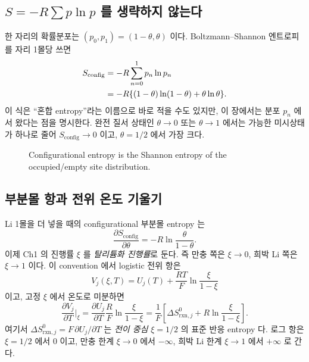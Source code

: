 \documentclass[11pt,a4paper]{article}
\newcommand{\rxn}{\mathrm{rxn}}
\newcommand{\conf}{\mathrm{config}}
\begin{document}
\subsection{\texorpdfstring{$S=-R\sum p\ln p$}{S=-R sum p ln p} 를 생략하지 않는다}
한 자리의 확률분포는 $(p_0,p_1)=(1-\theta,\theta)$ 이다. Boltzmann--Shannon
엔트로피를 자리 1몰당 쓰면
\begin{align}
S_\conf
&=-R\sum_{n=0}^{1}p_n\ln p_n \notag\\
&=-R\{(1-\theta)\ln(1-\theta)+\theta\ln\theta\}.
\label{eq:sconfig}
\end{align}
이 식은 ``혼합 entropy''라는 이름으로 바로 적을 수도 있지만, 이 장에서는 분포
$p_n$ 에서 왔다는 점을 명시한다. 완전 질서 상태인 $\theta\to0$ 또는 $\theta\to1$ 에서는 가능한 미시상태가
하나로 줄어 $S_\conf\to0$ 이고, $\theta=1/2$ 에서 가장 크다.

\begin{figure}[t]
\centering
{}
\caption{Configurational entropy is the Shannon entropy of the occupied/empty site distribution.}
\label{fig:sconfig}
\end{figure}

\subsection{부분몰 항과 전위 온도 기울기}
Li 1몰을 더 넣을 때의 configurational 부분몰 entropy 는
\begin{equation}
\frac{\partial S_\conf}{\partial \theta}
=-R\ln\frac{\theta}{1-\theta}.
\label{eq:partial_config_theta}
\end{equation}
이제 Ch1 의 진행률 $\xi$ 를 \emph{탈리튬화 진행률}로 둔다. 즉 만충 쪽은
$\xi\to0$, 희박 Li 쪽은 $\xi\to1$ 이다. 이 convention 에서 logistic 전위 항은
\begin{equation}
V_j(\xi,T)=U_j(T)+\frac{RT}{F}\ln\frac{\xi}{1-\xi}
\label{eq:vxi}
\end{equation}
이고, 고정 $\xi$ 에서 온도로 미분하면
\begin{equation}
\frac{\partial V_j}{\partial T}\bigg|_{\xi}
=\frac{\partial U_j}{\partial T}
 \frac{R}{F}\ln\frac{\xi}{1-\xi}
=\frac{1}{F}\left[
\Delta S^0_{\rxn,j}+R\ln\frac{\xi}{1-\xi}\right].
\label{eq:config_in_dudt}
\end{equation}
여기서 $\Delta S^0_{\rxn,j}=F\,\partial U_j/\partial T$ 는
\emph{전이 중심} $\xi=1/2$ 의 표준 반응 entropy 다. 로그 항은 $\xi=1/2$ 에서
0 이고, 만충 한계 $\xi\to0$ 에서 $-\infty$, 희박 Li 한계 $\xi\to1$ 에서
$+\infty$ 로 간다.
\end{document}
